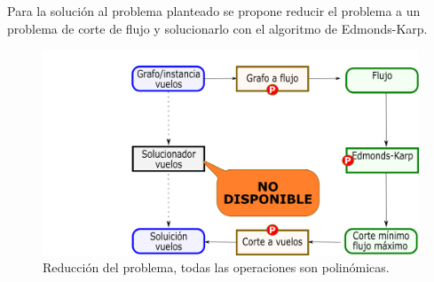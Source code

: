\documentclass[../tp3_grupo404.tex]{subfiles}
\begin{document}
Para la solución al problema planteado se propone reducir el problema a un problema de corte de flujo
y solucionarlo con el algoritmo de Edmonds-Karp.

\begin{figure}[H]
    \centering
    \includegraphics[width=0.9\linewidth,angle=0,origin=c]{out/reduc.png}
    \caption{\label{reduc}Reducción del problema, todas las operaciones son polinómicas.}
\end{figure}
\end{document}
